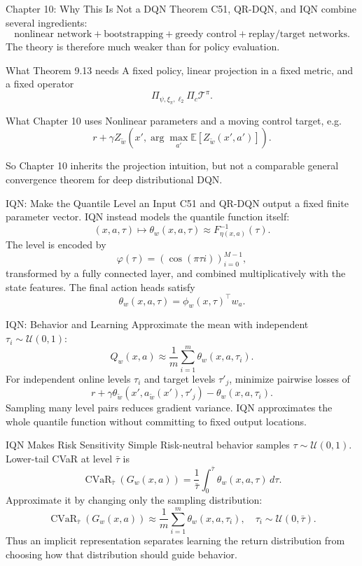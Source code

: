 \documentclass[10pt]{beamer}
\newcommand{\E}{\mathbb{E}}
\newcommand{\T}{\mathcal{T}}
\newcommand{\1}{\mathds{1}}
\begin{document}
\begin{frame}{Chapter 10: Why This Is Not a DQN Theorem}
  C51, QR-DQN, and IQN combine several ingredients:
  \[
    \text{nonlinear network}
    + \text{bootstrapping}
    + \text{greedy control}
    + \text{replay/target networks}.
  \]
  The theory is therefore much weaker than for policy evaluation.
  \begin{block}{What Theorem 9.13 needs}
    A fixed policy, linear projection in a fixed metric, and a fixed operator
    \[
      \Pi_{\psi,\xi_\pi,\ell_2}\Pi_c\T^\pi .
    \]
  \end{block}
  \begin{block}{What Chapter 10 uses}
    Nonlinear parameters and a moving control target, e.g.
    \[
      r+\gamma Z_{\widetilde w}
      \left(x',\arg\max_{a'}\E[Z_{\widetilde w}(x',a')]\right).
    \]
  \end{block}
  So Chapter 10 inherits the projection intuition, but not a comparable general
  convergence theorem for deep distributional DQN.
\end{frame}

\begin{frame}{IQN: Make the Quantile Level an Input}
  C51 and QR-DQN output a fixed finite parameter vector. IQN instead models
  the quantile function itself:
  \[
    (x,a,\tau)\longmapsto
    \theta_w(x,a,\tau)\approx F^{-1}_{\eta(x,a)}(\tau).
  \]
  The level is encoded by
  \[
    \varphi(\tau)=(\cos(\pi\tau i))_{i=0}^{M-1},
  \]
  transformed by a fully connected layer, and combined multiplicatively with
  the state features. The final action heads satisfy
  \[
    \theta_w(x,a,\tau)=\phi_w(x,\tau)^\top w_a.
  \]
\end{frame}

\begin{frame}{IQN: Behavior and Learning}
  Approximate the mean with independent $\tau_i\sim\mathcal U(0,1)$:
  \[
    Q_w(x,a)\approx\frac1m\sum_{i=1}^m\theta_w(x,a,\tau_i).
  \]
  For independent online levels $\tau_i$ and target levels $\tau'_j$, minimize
  pairwise losses of
  \[
    r+\gamma\theta_{\widetilde w}
      (x',a_{\widetilde w}(x'),\tau'_j)
    -\theta_w(x,a,\tau_i).
  \]
  Sampling many level pairs reduces gradient variance. IQN approximates the
  whole quantile function without committing to fixed output locations.
\end{frame}

\begin{frame}{IQN Makes Risk Sensitivity Simple}
  Risk-neutral behavior samples $\tau\sim\mathcal U(0,1)$. Lower-tail CVaR at
  level $\bar\tau$ is
  \[
    \operatorname{CVaR}_{\bar\tau}(G_w(x,a))
    =\frac1{\bar\tau}\int_0^{\bar\tau}\theta_w(x,a,\tau)\,d\tau.
  \]
  Approximate it by changing only the sampling distribution:
  \[
    \operatorname{CVaR}_{\bar\tau}(G_w(x,a))
    \approx\frac1m\sum_{i=1}^m\theta_w(x,a,\tau_i),
    \quad \tau_i\sim\mathcal U(0,\bar\tau).
  \]
  Thus an implicit representation separates learning the return distribution
  from choosing how that distribution should guide behavior.
\end{frame}
\end{document}
